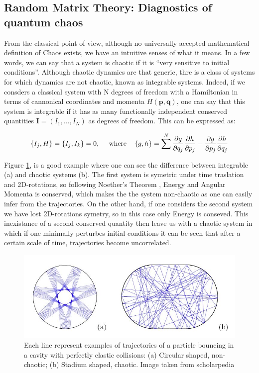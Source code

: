 \documentclass[11pt,a4paper]{article}
\begin{document}
\subsection{Random Matrix Theory: Diagnostics of quantum chaos}

From the classical point of view, although no universally accepted mathematical definition of Chaos exists, we have an intuitive senses of what it means. In a few words, we can say that a system is chaotic if it is \textquotedblleft very sensitive to initial conditions\textquotedblright. Although chaotic dynamics are that generic, thre is a class of systems 
for which dynamics are not chaotic, known as integrable systems. Indeed, if we consders a classical system with N degrees of freedom with a Hamiltonian in terms of cannonical coordinates and momenta $H(\mathbf{p},\mathbf{q})$, one can say that this system is integrable if it has as many functionally independent conserved quantities $\mathbf{I}=\left(I_1,...,I_N\right)$ as degrees of freedom. This can be expressed as:

\begin{equation}
    \left\{I_j,H\right\}=\left\{I_j,I_k\right\} = 0, ~~~~\text{where}~~~\left\{g,h\right\} = \sum^N\frac{\partial g}{\partial q_j}\frac{\partial h}{\partial p_j} - \frac{\partial g}{\partial p_j}\frac{\partial h}{\partial q_j}
\end{equation}

Figure \ref{Example_Chaos}, is a good example where one can see the difference between integrable (a) and chaotic systems (b). The first system is symetric under time traslation and 2D-rotations, so following Noether's Theorem \cite{Noether_1971}, Energy and Angular Momenta is conserved, which makes the the system non-chaotic as one can easily infer from the trajectories. On the other hand, if one considers the second system we have lost 2D-rotations symetry, so in this case only Energy is conseved. This inexistance of a second conserved quantity then leave us with a chaotic system in which if one minimally perturbes initial conditions it can be seen that after a certain scale of time, trajectories become uncorrelated.

\begin{figure}[ht]
    \centering
    \includegraphics[width=\linewidth]{figs/Stoe_billiards.jpg}
    \caption{Each line represent examples of trajectories of a particle bouncing in a cavity with perfectly elastic collisions: (a) Circular shaped, non-chaotic; (b) Stadium shaped, chaotic. Image taken from scholarpedia \cite{stockmann2010microwave}}
    \label{Example_Chaos}
\end{figure}
\end{document}
